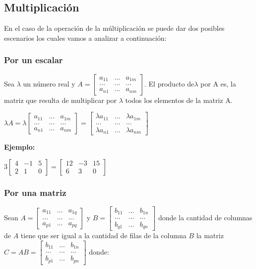 \subsection{Multiplicación}

En el caso de la operación de la múltiplicación se puede dar dos posibles escenarios los cuales vamos a analizar a continuación:

\subsubsection{Por un escalar}

Sea $\lambda$ un número real y $A=\begin{bmatrix} a_{11}  & ... & a_{1m} \\ ... & ... & ... \\ a_{n1}  & ... & a_{nm} \end{bmatrix} $. El producto de$\lambda$ por A es, la matriz que resulta de multiplicar por $\lambda$ todos los elementos de la matriz A.

$\lambda A= \lambda \begin{bmatrix} a_{11}  & ... & a_{1m} \\ ... & ... & ... \\ a_{n1}  & ... & a_{nm} \end{bmatrix} =\begin{bmatrix}  \lambda a_{11}  & ... &  \lambda a_{1m} \\ ... & ... & ... \\  \lambda a_{n1}  & ... &  \lambda a_{nm} \end{bmatrix}  $

\textbf{Ejemplo:}

$3\begin{bmatrix} 
	4  & -1 & 5 \\ 
	2 & 1 & 0  
\end{bmatrix} =\begin{bmatrix} 
	12  & -3 & 15 \\ 
	6 & 3 & 0  
\end{bmatrix} $

\subsubsection{Por una matriz}

Sean $A=\begin{bmatrix} a_{11}  & ... & a_{1q} \\ ... & ... & ... \\ a_{p1}  & ... & a_{pq} \end{bmatrix} $ y $B=\begin{bmatrix} b_{11}  & ... & b_{1n} \\ ... & ... & ... \\ b_{q1}  & ... & b_{qn} \end{bmatrix} $ donde la cantidad de columnas de $A$ tiene que ser igual a la cantidad de filas de la columna $B$ la matriz $ C = AB = \begin{bmatrix} b_{11}  & ... & b_{1n} \\ ... & ... & ... \\ b_{p1}  & ... & b_{pn} \end{bmatrix}$ donde:

